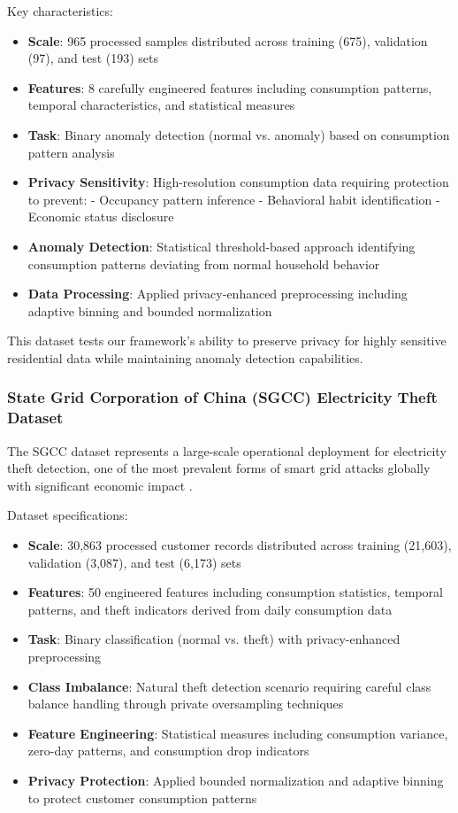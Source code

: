 \documentclass{ieeeaccess}
\theoremstyle{definition}
\begin{document}
Key characteristics:
\begin{itemize}
\item \textbf{Scale}: 965 processed samples distributed across training (675), validation (97), and test (193) sets
\item \textbf{Features}: 8 carefully engineered features including consumption patterns, temporal characteristics, and statistical measures
\item \textbf{Task}: Binary anomaly detection (normal vs. anomaly) based on consumption pattern analysis
\item \textbf{Privacy Sensitivity}: High-resolution consumption data requiring protection to prevent:
  - Occupancy pattern inference
  - Behavioral habit identification  
  - Economic status disclosure
\item \textbf{Anomaly Detection}: Statistical threshold-based approach identifying consumption patterns deviating from normal household behavior
\item \textbf{Data Processing}: Applied privacy-enhanced preprocessing including adaptive binning and bounded normalization
\end{itemize}

This dataset tests our framework's ability to preserve privacy for highly sensitive residential data while maintaining anomaly detection capabilities.

\subsubsection{State Grid Corporation of China (SGCC) Electricity Theft Dataset}

The SGCC dataset represents a large-scale operational deployment for electricity theft detection, one of the most prevalent forms of smart grid attacks globally with significant economic impact \cite{yan2021performance}.

Dataset specifications:
\begin{itemize}
\item \textbf{Scale}: 30,863 processed customer records distributed across training (21,603), validation (3,087), and test (6,173) sets
\item \textbf{Features}: 50 engineered features including consumption statistics, temporal patterns, and theft indicators derived from daily consumption data
\item \textbf{Task}: Binary classification (normal vs. theft) with privacy-enhanced preprocessing
\item \textbf{Class Imbalance}: Natural theft detection scenario requiring careful class balance handling through private oversampling techniques
\item \textbf{Feature Engineering}: Statistical measures including consumption variance, zero-day patterns, and consumption drop indicators
\item \textbf{Privacy Protection}: Applied bounded normalization and adaptive binning to protect customer consumption patterns
\end{itemize}
\end{document}
